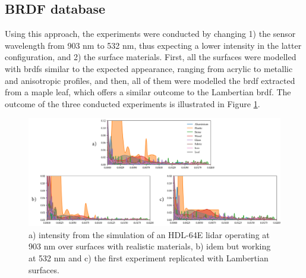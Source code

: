 \subsection{BRDF database}

Using this approach, the experiments were conducted by changing 1) the sensor wavelength from 903 \si{\nano\meter} to 532 \si{\nano\meter}, thus expecting a lower intensity in the latter configuration, and 2) the surface materials. First, all the surfaces were modelled with \acrshort{brdf}s similar to the expected appearance, ranging from acrylic to metallic and anisotropic profiles, and then, all of them were modelled the \acrshort{brdf} extracted from a maple leaf, which offers a similar outcome to the Lambertian \acrshort{brdf}. The outcome of the three conducted experiments is illustrated in Figure \ref{fig:database_intensity_results}. 

\begin{figure}[ht]
	\centering
	\includegraphics[width=\linewidth]{figs/lidar_intensity/database_intensity_chart.png}
	\caption{a) intensity from the simulation of an HDL-64E \acrshort{lidar} operating at 903 \si{\nano\meter} over surfaces with realistic materials, b) idem but working at 532 \si{\nano\meter} and c) the first experiment replicated with Lambertian surfaces. }
	\label{fig:database_intensity_results}
\end{figure}


